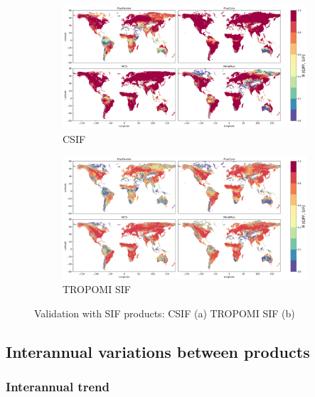 \begin{figure}[p]
    \centering
    \begin{subfigure}{\textwidth}
      \centering
      \includegraphics[width=\textwidth]{figs/chap6/val_CSIF.png}
      \caption{CSIF}
      \label{fig:chap6_fig5a}
    \end{subfigure}

    \begin{subfigure}{\textwidth}
      \centering
      \includegraphics[width=\textwidth]{figs/chap6/val_TROPOMI_SIF.png}
      \caption{TROPOMI SIF}
      \label{fig:chap6_fig5b}
    \end{subfigure}
    \caption[Validation with SIF products]{Validation with SIF products: CSIF (a) TROPOMI SIF (b)}
    \label{fig:chap6_fig5}
\end{figure}


\subsection{Interannual variations between products}
\subsubsection*{Interannual trend}

